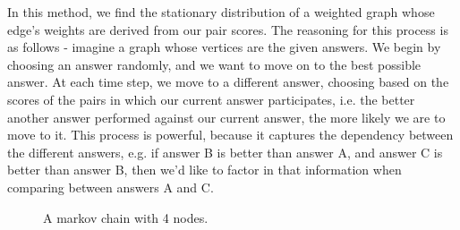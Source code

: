 \documentclass{article}
\begin{document}
In this method, we find the stationary distribution of a weighted graph whose edge's weights are derived from our pair scores.
The reasoning for this process is as follows - imagine a graph whose vertices are the given answers. We begin by choosing an answer randomly, and we want to move on to the best possible answer. At each time step, we move to a different answer, choosing based on the scores of the pairs in which our current answer participates, i.e. the better another answer performed against our current answer, the more likely we are to move to it.
This process is powerful, because it captures the dependency between the different answers, e.g. if answer B is better than answer A, and answer C is better than answer B, then we'd like to factor in that information when comparing between answers A and C. 


\begin{figure}[h!]
	\begin{center}
	\end{center}
	\caption{A markov chain with 4 nodes.}
	\label{fig:markov_chain}
\end{figure}
\end{document}
